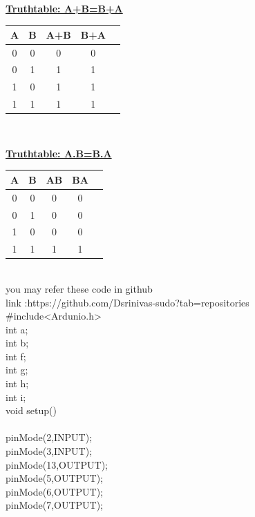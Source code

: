 \documentclass[letterpaper, 10 pt, conference]{ieeeconf}
\begin{document}
\vspace{5cm}
\\ \raggedright \textbf{\underline{Truthtable: A+B=B+A}}\vspace{2mm}
\begin{table}[ht]
\centering %
\begin{tabular}{c c c c c} %
\hline\hline %
 \textbf{A} & \textbf{B} & \textbf{A+B} &\textbf{B+A}\\ [0.5ex] %
\hline
      0 & 0 & 0 & 0\\
      0 & 1 & 1 & 1\\
      1 & 0 & 1 & 1\\
      1 & 1 & 1 & 1\\
\hline
\end{tabular}
\end{table}
\vspace{2cm}
\\ \raggedright \textbf{\underline{Truthtable: A.B=B.A}}\vspace{2mm}
\begin{table}[ht]
\centering %
\begin{tabular}{c c c c c} %
\hline\hline %
  \textbf{A} & \textbf{B} & \textbf{AB} &\textbf{BA}\\ [0.5ex] %
\hline
      0 & 0 & 0 & 0\\
      0 & 1 & 0 & 0\\
      1 & 0 & 0 & 0\\
      1 & 1 & 1 & 1\\
\hline
\end{tabular}
\end{table}
\raggedright \textbf{\underline{}}\vspace{7mm}
\\you may  refer these code in github
\\ link    :https://github.com/Dsrinivas-sudo?tab=repositories
\vspace{2cm}
\\ #include<Ardunio.h>
\\int a;
\\int b;
\\int f;
\\int g;
\\int h;
\\int i;
\\void setup()
\\{
\\pinMode(2,INPUT);
\\pinMode(3,INPUT);
\\pinMode(13,OUTPUT);
\\pinMode(5,OUTPUT);
\\pinMode(6,OUTPUT);
\\pinMode(7,OUTPUT);
\\}
\end{document}
